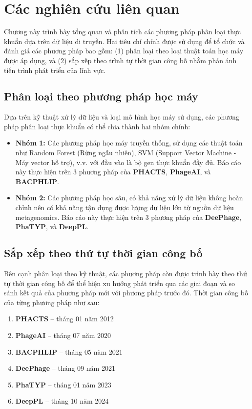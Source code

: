 \chapter{Các nghiên cứu liên quan} \label{chap2}

Chương này trình bày tổng quan và phân tích các phương pháp phân loại thực khuẩn dựa trên dữ liệu di truyền. Hai tiêu chí chính được sử dụng để tổ chức và đánh giá các phương pháp bao gồm: (1) phân loại theo loại thuật toán học máy được áp dụng, và (2) sắp xếp theo trình tự thời gian công bố nhằm phản ánh tiến trình phát triển của lĩnh vực.

\section{Phân loại theo phương pháp học máy}

Dựa trên kỹ thuật xử lý dữ liệu và loại mô hình học máy sử dụng, các phương pháp phân loại thực khuẩn có thể chia thành hai nhóm chính:

\begin{itemize}
    \item \textbf{Nhóm 1:} Các phương pháp học máy truyền thống, sử dụng các thuật toán như Random Forest (Rừng ngẫu nhiên), SVM (Support Vector Machine - Máy vector hỗ trợ), v.v. với đầu vào là bộ gen thực khuẩn đầy đủ. Báo cáo này thực hiện trên 3 phương pháp của \textbf{PHACTS}, \textbf{PhageAI}, và \textbf{BACPHLIP}.
    
    \item \textbf{Nhóm 2:} Các phương pháp học sâu, có khả năng xử lý dữ liệu không hoàn chỉnh nên có khả năng tận dụng được lượng dữ liệu lớn từ nguồn dữ liệu metagenomics. Báo cáo này thực hiện trên 3 phương pháp của \textbf{DeePhage}, \textbf{PhaTYP}, và \textbf{DeepPL}.
\end{itemize}

\section{Sắp xếp theo thứ tự thời gian công bố}

Bên cạnh phân loại theo kỹ thuật, các phương pháp còn được trình bày theo thứ tự thời gian công bố để thể hiện xu hướng phát triển qua các giai đoạn và so sánh kết quả của phương pháp mới với phương pháp trước đó. Thời gian công bố của từng phương pháp như sau:

\begin{enumerate}
    \item \textbf{PHACTS} – tháng 01 năm 2012
    \item \textbf{PhageAI} – tháng 07 năm 2020
    \item \textbf{BACPHLIP} – tháng 05 năm 2021
    \item \textbf{DeePhage} – tháng 09 năm 2021
    \item \textbf{PhaTYP} – tháng 01 năm 2023
    \item \textbf{DeepPL} – tháng 10 năm 2024
\end{enumerate}

